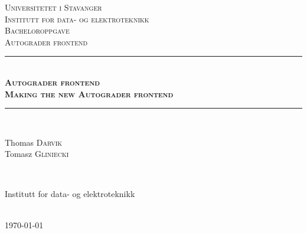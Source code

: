 \begin{titlepage}

\newcommand{\HRule}{\rule{\linewidth}{0.5mm}} %

\center %

\begin{figure}[H] %
\end{figure}

\textsc{\LARGE Universitetet i Stavanger \\\small Institutt for data- og elektroteknikk}\\[1.5cm] %
\textsc{\Large Bacheloroppgave}\\[0.5cm] %
\textsc{\large Autograder frontend}\\[0.5cm] %

\HRule \\[0.4cm]
{ \huge \bf{\textsc{Autograder frontend\\\large Making the new Autograder frontend}}}\\[0.4cm] %
\HRule \\[1.5cm]



\begin{minipage}{0.4\textwidth}
  \begin{flushleft} \large
    {\Large Thomas \textsc{Darvik}}
    \\
    {\Large Tomasz \textsc{Gliniecki}}
  \end{flushleft}
\end{minipage}
~
\begin{minipage}{0.4\textwidth}
  \begin{flushright}
    {Institutt for data- og elektroteknikk}
  \end{flushright}
\end{minipage}\\[4cm]

{\large \today}\\[3cm] %


\vfill %

\end{titlepage}
